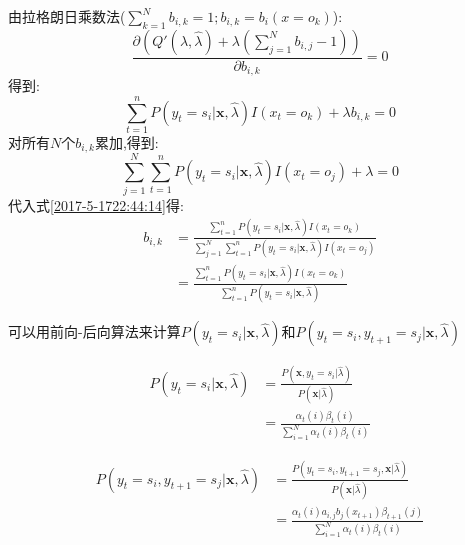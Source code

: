 \documentclass[UTF8,a4paper]{ctexart}%
\begin{document}
            由拉格朗日乘数法($\sum_{k = 1}^N b_{i,k} = 1;b_{i,k} = b_i(x = o_k)$):
            \begin{equation}
              \frac{\partial\left( Q'(\lambda,\hat{\lambda}) + \lambda\left( \sum_{j = 1}^N b_{i,j}  - 1 \right) \right)}{\partial b_{i,k}} = 0
            \end{equation}
            得到:
            \begin{equation}
               \sum_{t = 1}^n P(y_t = s_i|\bm{x},\hat{\lambda})I(x_t = o_k)  + \lambda b_{i,k} = 0
              \label{2017-5-1722:44:14}
            \end{equation}
            对所有$N$个$b_{i,k}$累加,得到:
            \begin{equation}
              \sum_{j = 1}^N \sum_{t = 1}^n P(y_t = s_i|\bm{x},\hat{\lambda})I(x_t = o_j)  + \lambda = 0
            \end{equation}
            代入式\eqref{2017-5-1722:44:14}得:
            \begin{equation}
              \begin{split}
              b_{i,k} &= \frac{\sum_{t = 1}^n P(y_t = s_i|\bm{x},\hat{\lambda})I(x_t = o_k)}
                  {\sum_{j = 1}^N \sum_{t = 1}^n P(y_t = s_i|\bm{x},\hat{\lambda})I(x_t = o_j)}\\
              &= \frac{\sum_{t = 1}^n P(y_t = s_i|\bm{x},\hat{\lambda})I(x_t = o_k)}
              { \sum_{t = 1}^n P(y_t = s_i|\bm{x},\hat{\lambda})}
            \end{split}
            \end{equation}

            可以用前向-后向算法来计算$P(y_t = s_i|\bm{x},\hat{\lambda})$和$P(y_t = s_i , y_{t+1} = s_j|\bm{x},\hat{\lambda})$

            \begin{equation}
              \begin{split}
              P(y_t = s_i|\bm{x},\hat{\lambda}) &= \frac{P(\bm{x},y_t = s_i|\hat{\lambda})}
                {P(\bm{x}|\hat{\lambda})} \\
                &= \frac{\alpha_t(i)\beta_t(i)}{\sum_{i = 1}^N \alpha_t(i) \beta_t(i)}
              \end{split}
            \end{equation}

            \begin{equation}
              \begin{split}
              P(y_t = s_i , y_{t+1} = s_j|\bm{x},\hat{\lambda})
              &= \frac{  P(y_t = s_i , y_{t+1} = s_j,\bm{x}|\hat{\lambda})}{  P(\bm{x}|\hat{\lambda})}\\
              &= \frac{\alpha_t(i)a_{i,j}b_j(x_{t+1})\beta_{t+1}(j)}{\sum_{i = 1}^N \alpha_t(i) \beta_t(i)}
            \end{split}
            \end{equation}
\end{document}
